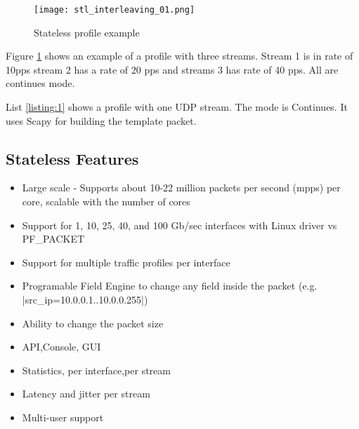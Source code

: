 \documentclass[conference]{IEEEtran}
\begin{document}
\begin{figure}[h]
  \texttt{[image: stl\_interleaving\_01.png]}
  \caption{Stateless profile example}
  \label{fig:stlhello}
\end{figure}

Figure \ref{fig:stlhello} shows an example of a profile with three streams.  
Stream 1 is in rate of 10pps stream 2 has a rate of 20 pps and streams 3 has rate of 40 pps. All are continues mode.

List \ref{listing:1} shows a profile with one UDP stream. The mode is Continues. 
It uses Scapy for building the template packet. 

  
\subsection{Stateless Features}

\begin{itemize}
  \item Large scale - Supports about 10-22 million packets per second (mpps) per core, scalable with the number of cores
  \item Support for 1, 10, 25, 40, and 100 Gb/sec interfaces with Linux driver vs PF\_PACKET
  \item Support for multiple traffic profiles per interface
  \item Programable Field Engine to change any field inside the packet (e.g. |src_ip=10.0.0.1..10.0.0.255|)
  \item Ability to change the packet size 
  \item API,Console, GUI
  \item Statistics, per interface,per stream 
  \item Latency and jitter per stream
  \item Multi-user support 
\end{itemize}
\end{document}

